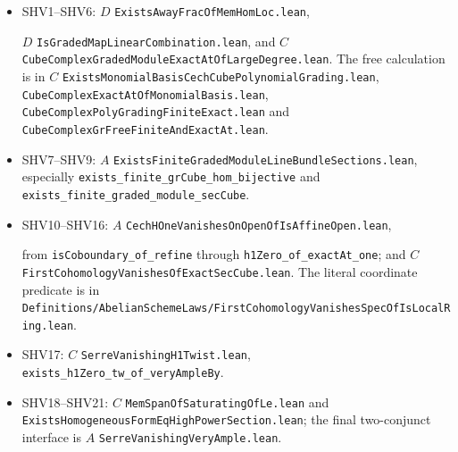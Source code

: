 \documentclass[11pt,a4paper]{article}
\numberwithin{equation}{section}
\theoremstyle{remark}\newtheorem{remark}[theorem]{Remark}
\begin{document}
\begin{itemize}
\item SHV1--SHV6: $D$ \texttt{Exists\allowbreak Away\allowbreak Frac\allowbreak Of\allowbreak Mem\allowbreak Hom\allowbreak Loc.\allowbreak lean},\par
$D$ \texttt{Is\allowbreak Graded\allowbreak Map\allowbreak Linear\allowbreak Combination.\allowbreak lean}, and
$C$ \texttt{Cube\allowbreak Complex\allowbreak Graded\allowbreak Module\allowbreak Exact\allowbreak At\allowbreak Of\allowbreak Large\allowbreak Degree.\allowbreak lean}.
The free calculation is in
$C$ \texttt{Exists\allowbreak Monomial\allowbreak Basis\allowbreak Cech\allowbreak Cube\allowbreak Polynomial\allowbreak Grading.\allowbreak lean},
\texttt{Cube\allowbreak Complex\allowbreak Exact\allowbreak At\allowbreak Of\allowbreak Monomial\allowbreak Basis.\allowbreak lean},
\texttt{Cube\allowbreak Complex\allowbreak Poly\allowbreak Grading\allowbreak Finite\allowbreak Exact.\allowbreak lean} and
\texttt{Cube\allowbreak Complex\allowbreak Gr\allowbreak Free\allowbreak Finite\allowbreak And\allowbreak Exact\allowbreak At.\allowbreak lean}.
\item SHV7--SHV9: $A$
\texttt{Exists\allowbreak Finite\allowbreak Graded\allowbreak Module\allowbreak Line\allowbreak Bundle\allowbreak Sections.\allowbreak lean},
especially \texttt{exists\_\allowbreak finite\_\allowbreak gr\allowbreak Cube\_\allowbreak hom\_\allowbreak bijective} and
\texttt{exists\_\allowbreak finite\_\allowbreak graded\_\allowbreak module\_\allowbreak sec\allowbreak Cube}.
\item SHV10--SHV16: $A$
\texttt{Cech\allowbreak HOne\allowbreak Vanishes\allowbreak On\allowbreak Open\allowbreak Of\allowbreak Is\allowbreak Affine\allowbreak Open.\allowbreak lean},\par
from \texttt{is\allowbreak Coboundary\_\allowbreak of\_\allowbreak refine} through
\texttt{h1\allowbreak Zero\_\allowbreak of\_\allowbreak exact\allowbreak At\_\allowbreak one}; and $C$
\texttt{First\allowbreak Cohomology\allowbreak Vanishes\allowbreak Of\allowbreak Exact\allowbreak Sec\allowbreak Cube.\allowbreak lean}.
The literal coordinate predicate is in
\texttt{Definitions/\allowbreak Abelian\allowbreak Scheme\allowbreak Laws/\allowbreak First\allowbreak Cohomology\allowbreak Vanishes\allowbreak Spec\allowbreak Of\allowbreak Is\allowbreak Local\allowbreak Ring.\allowbreak lean}.
\item SHV17: $C$ \texttt{Serre\allowbreak Vanishing\allowbreak H1\allowbreak Twist.\allowbreak lean},
\texttt{exists\_\allowbreak h1\allowbreak Zero\_\allowbreak tw\_\allowbreak of\_\allowbreak very\allowbreak Ample\allowbreak By}.
\item SHV18--SHV21: $C$ \texttt{Mem\allowbreak Span\allowbreak Of\allowbreak Saturating\allowbreak Of\allowbreak Le.\allowbreak lean}
and \texttt{Exists\allowbreak Homogeneous\allowbreak Form\allowbreak Eq\allowbreak High\allowbreak Power\allowbreak Section.\allowbreak lean};
the final two-conjunct interface is $A$
\texttt{Serre\allowbreak Vanishing\allowbreak Very\allowbreak Ample.\allowbreak lean}.
\end{itemize}
\end{document}

